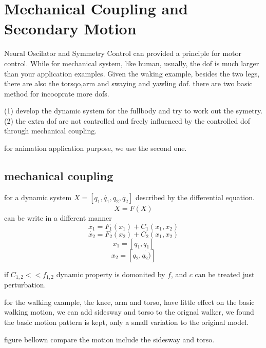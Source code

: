 \section{Mechanical Coupling and Secondary Motion}
Neural Oscilator and Symmetry Control can provided a principle for motor control.
While for mechanical system, like human, usually, the dof is much larger than your application examples.
Given the waking example, besides the two legs, there are also the torsqo,arm and swaying and yawling dof.
there are two basic method for incooprate more dofs.

(1) develop the dynamic system for the fullbody and try to work out the symetry.
(2) the extra dof are not controlled and freely influenced by the controlled dof through mechanical coupling.


for animation application purpose,
we use the second one.


\subsection{mechanical coupling}
for a dynamic system $X=[q_1,\dot{q_1},q_2,\dot{q_2}]$
described by the differential equation.
\[
\dot{X}=F(X)
\]
can be write in a different manner
\[
\dot{x_1}=F_1(x_1)+C_1(x_1,x_2)
\]
\[
\dot{x_2}=F_2(x_2)+C_2(x_1,x_2)
\]
\[
x_1=[q_1,\dot{q_1}]
\]
\[
x_2=[q_2,\dot{q_2)}]
\]

if $C_{1,2}<<f_{1,2}$
dynamic property is domonited by $f$, and $c$ can be treated just perturbation.


for the walking example, the knee, arm and torso, have little effect on the basic walking motion,
we can add sidesway and torso to the orignal walker,
we found the basic motion pattern is kept, only a small variation to the original model.

figure bellown compare the motion include the sidesway and torso.


